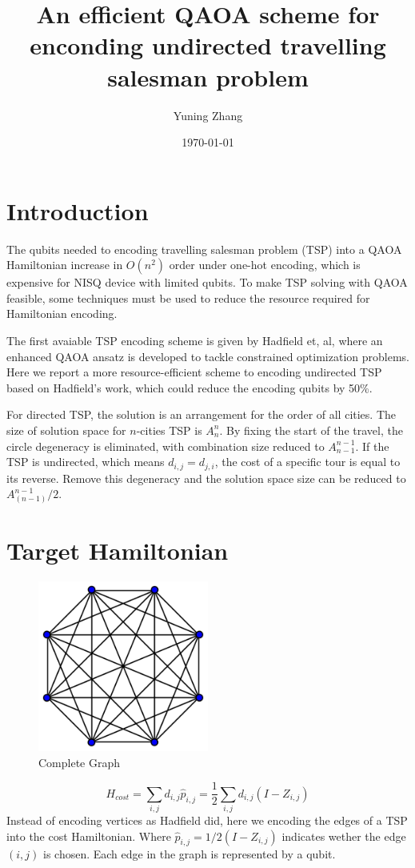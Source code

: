 \documentclass[%
aps, %
prl, %
preprint, %
12pt, %
amsfonts, %
amssymb, %
amsmath, %
notitlepage, %
raggedbottom, %
]{revtex4-1}
\begin{document}
\preprint{}

\title{An efficient QAOA scheme for enconding undirected travelling salesman problem}
\author{Yuning Zhang}


\date{\today}
\maketitle

\section{Introduction}
The qubits needed to encoding travelling salesman problem (TSP) into a QAOA Hamiltonian increase in $O(n^2)$ order under one-hot encoding, which is expensive for NISQ device with limited qubits. To make TSP solving with QAOA feasible, some techniques must be used to reduce the resource required for Hamiltonian encoding.

The first avaiable TSP encoding scheme is given by Hadfield et, al, where an enhanced QAOA ansatz is developed to tackle constrained optimization problems. Here we report a more resource-efficient scheme to encoding undirected TSP based on Hadfield's work, which could reduce the encoding qubits by 50\%.

For directed TSP, the solution is an arrangement for the order of all cities. The size of solution space for $n$-cities TSP is $A_n^n$. By fixing the start of the travel, the circle degeneracy is eliminated, with combination size reduced to $A_{n-1}^{n-1}$. If the TSP is undirected, which means $d_{i,j}=d_{j,i}$, the cost of a specific tour is equal to its reverse. Remove this degeneracy and the solution space size can be reduced to $A_{(n-1)}^{n-1}/2$.

\section{Target Hamiltonian}
\begin{figure}[b]
    \centering
    \includegraphics[width=0.5\textwidth]{comp_graph.png}
    \caption{Complete Graph}
    \label{}
\end{figure}
$$
H_{cost}=\sum_{i,j} d_{i,j} \hat p_{i,j}=\frac{1}{2}\sum_{i,j} d_{i,j} (I-Z_{i,j})
$$
Instead of encoding vertices as Hadfield did, here we encoding the edges of a TSP into the cost Hamiltonian. Where $\hat p_{i,j}=1/2(I-Z_{i,j})$ indicates wether the edge $(i,j)$ is chosen. Each edge in the graph is represented by a qubit.
\end{document}
